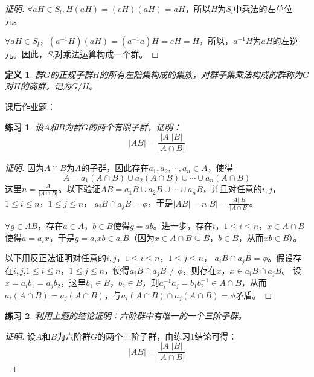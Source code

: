 \documentclass{article}
\newtheorem{Def}{定义}
\newtheorem{Exercise}{练习}
\begin{document}
\begin{CJK*}{UTF8}{gbsn}
\begin{proof}[证明]
    $\forall aH\in S_l,H(aH)=(eH)(aH)=aH$，所以$H$为$S_l$中乘法的左单位元。
  
    $\forall aH\in S_l$，$(a^{-1}H)(aH)=(a^{-1}a)H=eH=H$，所以，$a^{-1}H$为$aH$的左逆元。因此，$S_l$对乘法运算构成一个群。
  \end{proof}
  \begin{Def}
    群$G$的正规子群$H$的所有左陪集构成的集族，对群子集乘法构成的群称为$G$对$H$的商群，记为$G/H$。
  \end{Def}  



课后作业题：
\begin{Exercise}
设$A$和$B$为群$G$的两个有限子群，证明：
\[|AB|=\frac{|A||B|}{|A\cap B|}\]
\end{Exercise}
\begin{proof}[证明]
  因为$A\cap B$为$A$的子群，因此存在$a_1,a_2,\cdots,a_n\in A$，使得
  \[A=a_1(A\cap B)\cup a_2(A\cap B)\cup \cdots \cup a_n(A\cap B)\]
  这里$n=\frac{|A|}{|A\cap B|}$。以下验证$AB=a_1B\cup a_2B\cup \cdots \cup a_nB$，并且对任意的$i,j$，$1\leq i \leq n$，$1\leq j \leq n$，
  $a_iB\cap a_jB=\phi$，于是$|AB|=n|B|=\frac{|A||B|}{|A\cap B|}$。

  $\forall g\in AB$，存在$a\in A$，$b\in B$使得$g=ab$。进一步，存在$i$，$1\leq i\leq n$，$x\in A\cap B$使得$a=a_ix$，于是$g=a_ixb\in a_iB$（因为$x\in A\cap B\subseteq B$，$b\in B$，从而$xb\in B$）。

以下用反正法证明对任意的$i,j$，$1\leq i \leq n$，$1\leq j \leq n$，
$a_iB\cap a_jB=\phi$。假设存在$i,j$,$1\leq i \leq n$，$1\leq j \leq n$，使得$a_iB\cap a_jB\neq \phi$，则存在$x$，$x\in a_iB\cap a_jB$。
设$x=a_ib_1=a_jb_2$，这里$b_1\in B$，$b_2\in B$，则$a_i^{-1}a_j=b_1b_2^{-1}\in A\cap B$，从而$a_i(A\cap B)=a_j(A\cap B)$，与$a_i(A\cap B)\cap a_j(A\cap B)=\phi$矛盾。

\end{proof}
\begin{Exercise}
  利用上题的结论证明：六阶群中有唯一的一个三阶子群。
\end{Exercise}
\begin{proof}[证明]
  设$A$和$B$为六阶群$G$的两个三阶子群，由练习1结论可得：
  \[|AB|=\frac{|A||B|}{|A\cap B|}\]


\end{proof}
\end{CJK*}
\end{document}
